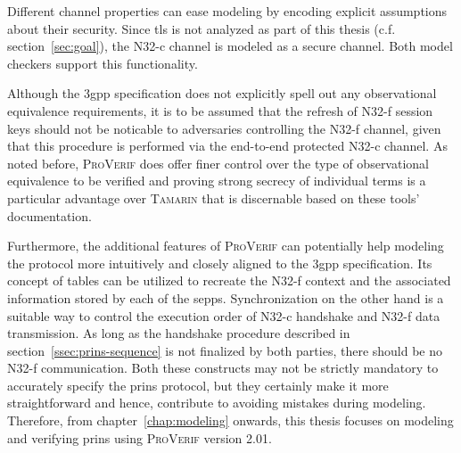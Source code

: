 Different channel properties can ease modeling by encoding explicit assumptions about their security.
Since \gls{tls} is not analyzed as part of this thesis (c.f. section~\ref{sec:goal}), the N32-c channel is modeled as a secure channel.
Both model checkers support this functionality.

Although the \gls{3gpp} specification does not explicitly spell out any observational equivalence requirements, it is to be assumed that the refresh of N32-f session keys should not be noticable to adversaries controlling the N32-f channel, given that this procedure is performed via the end-to-end protected N32-c channel.
As noted before, \textsc{ProVerif} does offer finer control over the type of observational equivalence to be verified and proving strong secrecy of individual terms is a particular advantage over \textsc{Tamarin} that is discernable based on these tools' documentation.

Furthermore, the additional features of \textsc{ProVerif} can potentially help modeling the protocol more intuitively and closely aligned to the \gls{3gpp} specification.
Its concept of tables can be utilized to recreate the N32-f context and the associated information stored by each of the \glspl{sepp}.
Synchronization on the other hand is a suitable way to control the execution order of \mbox{N32-c} handshake and N32-f data transmission.
As long as the handshake procedure described in section~\ref{ssec:prins-sequence} is not finalized by both parties, there should be no N32-f communication.
Both these constructs may not be strictly mandatory to accurately specify the \gls{prins} protocol, but they certainly make it more straightforward and hence, contribute to avoiding mistakes during modeling.
Therefore, from chapter~\ref{chap:modeling} onwards, this thesis focuses on modeling and verifying \gls{prins} using \textsc{ProVerif} version 2.01.